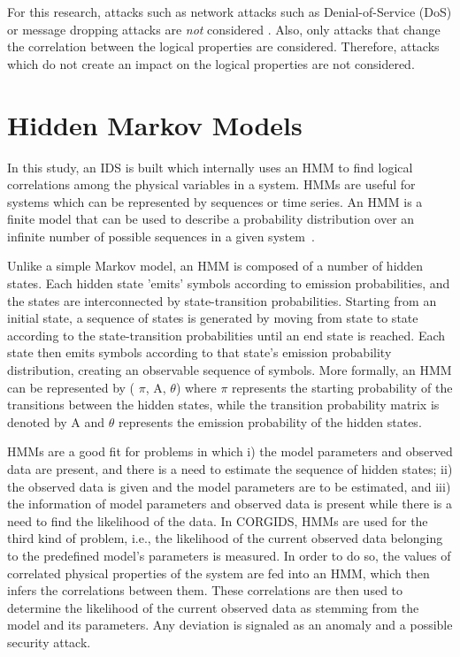 For this research, attacks such as network attacks such as Denial-of-Service (DoS) or message dropping attacks are \textit{not} considered . Also, only attacks that change the correlation between the logical properties are considered. Therefore, attacks which do not create an impact on the logical properties are not considered. 

\section{Hidden Markov Models}
\label{sec:HMM_explain}

In this study, an IDS is built which internally uses an HMM to find logical correlations among the physical variables in a system. HMMs are useful for systems which can be represented by sequences or time series. An HMM is a finite model that can be used to describe a probability distribution over an infinite number of possible sequences in a given system~\cite{eddy1996hidden}.

Unlike a simple Markov model, an HMM is composed of a number of hidden states. Each hidden state 'emits' symbols according to emission probabilities, and the states are interconnected by state-transition probabilities. Starting from an initial state, a sequence of states is generated by moving from state to state according to the state-transition probabilities until an end state is reached. Each state then emits symbols according to that state's emission probability distribution, creating an observable sequence of symbols.
More formally, an HMM can be represented by ( $\pi$, A, $\theta$) where $\pi$ represents the starting probability of the transitions between the hidden states, while the transition probability matrix is denoted by A and $\theta$ represents the emission probability of the hidden states.

HMMs are a good fit for problems in which i) the model parameters and observed data are present, and there is a need to estimate the sequence of hidden states; ii) the observed data is given and the model parameters are to be estimated, and iii) the information of model parameters and observed data is present while there is a need to find the likelihood of the data. In CORGIDS, HMMs are used for the third kind of problem, i.e., the likelihood of the current observed data belonging to the predefined model's parameters is measured. In order to do so, the values of correlated physical properties of the system are fed into an HMM, which then infers the correlations between them. These correlations are then used to determine the likelihood of the current observed data as stemming from the model and its parameters. Any deviation is signaled as an anomaly and a possible security attack.

